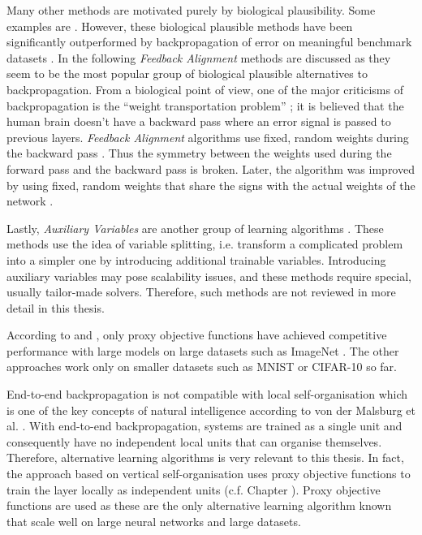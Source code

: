 Many other methods are motivated purely by biological plausibility.
Some examples are \cite{10.5555.3157096.3157213, Lillicrap_Cownden_Tweed_Akerman_2016, Xiao_Chen_Liao_Poggio_2019, aaai.BalduzziVB15, 10.5555/3016100.3016156}.
However, these biological plausible methods have been significantly outperformed by backpropagation of error on meaningful benchmark datasets .
In the following \emph{Feedback Alignment} methods are discussed as they seem to be the most popular group of biological plausible alternatives to backpropagation.
From a biological point of view, one of the major criticisms of backpropagation is the ``weight transportation problem'' ; it is believed that the human brain doesn't have a backward pass where an error signal is passed to previous layers.
\emph{Feedback Alignment} algorithms use fixed, random weights during the backward pass \cite{Lillicrap_Cownden_Tweed_Akerman_2016}.
Thus the symmetry between the weights used during the forward pass and the backward pass is broken.
Later, the algorithm was improved by using fixed, random weights that share the signs with the actual weights of the network .

Lastly, \emph{Auxiliary Variables} are another group of learning algorithms \cite{pmlr-v33-carreira-perpinan14, 10.5555/3045390.3045677, 10.5555/3294771.3294935, Lau_Zeng_Wu_Yao_2018}.
These methods use the idea of variable splitting, i.e. transform a complicated problem into a simpler one by introducing additional trainable variables.
Introducing auxiliary variables may pose scalability issues, and these methods require special, usually tailor-made solvers.
Therefore, such methods are not reviewed in more detail in this thesis.

According to  and , only proxy objective functions have achieved competitive performance with large models on large datasets such as ImageNet \cite{Deng_Dong_Socher_Li_KaiLi_LiFei_Fei_2009}.
The other approaches work only on smaller datasets such as MNIST \cite{Lecun_Bottou_Bengio_Haffner_1998} or CIFAR-10 \cite{krizhevsky2009learning} so far.

End-to-end backpropagation is not compatible with local self-organisation which is one of the key concepts of natural intelligence according to von der Malsburg et al. .
With end-to-end backpropagation, systems are trained as a single unit and consequently have no independent local units that can organise themselves.
Therefore, alternative learning algorithms is very relevant to this thesis.
In fact, the approach based on vertical self-organisation uses proxy objective functions to train the layer locally as independent units (c.f. Chapter ).
Proxy objective functions are used as these are the only alternative learning algorithm known that scale well on large neural networks and large datasets.

